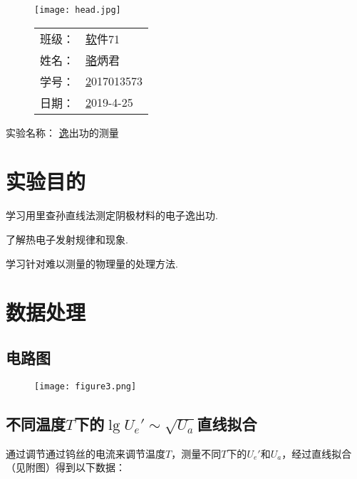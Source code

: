 \documentclass{thureport}
\newcommand{\major}{软件71}
\newcommand{\name}{骆炳君}
\newcommand{\stuid}{2017013573}
\newcommand{\newdate}{2019-4-25}
\newcommand{\newtitle}{逸出功的测量}
\begin{document}
\thispagestyle{empty}
\begin{figure}[h]
	\begin{minipage}{0.65\linewidth}
		\centerline{\texttt{[image: head.jpg]}}
	\end{minipage}
	\hfill
	\begin{minipage}{.3\linewidth}
		\raggedleft
		\begin{tabular*}{.8\linewidth}{ll}
			班级： & \underline\major   \\
			姓名： & \underline\name    \\
			学号： & \underline\stuid   \\
			日期： & \underline\newdate
		\end{tabular*}
	\end{minipage}
\end{figure}

\begin{table}[!htbp]
	\centering\large
	实验名称： \underline\newtitle
\end{table}

\tableofcontents
\newpage

\section{实验目的}
\begin{clause}
	\item 学习用里查孙直线法测定阴极材料的电子逸出功.
	\item 了解热电子发射规律和现象.
	\item 学习针对难以测量的物理量的处理方法.
\end{clause}

\section{数据处理}
\subsection{电路图}
\begin{figure}[h]
	\centering
	\texttt{[image: figure3.png]}
\end{figure}

\subsection{不同温度$T$下的$\lg{U_e'}\sim \sqrt{U_a}$直线拟合}
通过调节通过钨丝的电流来调节温度$T$，测量不同$T$下的$U_e'$和$U_a$，经过直线拟合（见附图）得到以下数据：
\end{document}
